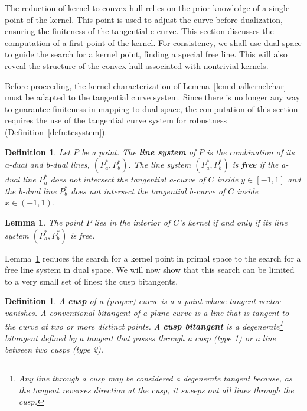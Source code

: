 \documentclass{sig-alternate}
\newtheorem{lemma}[theorem]{Lemma}
\newtheorem{defn2}[theorem]{Definition}
\begin{document}
The reduction of kernel to convex hull relies on the prior knowledge
of a single point of the kernel.
This point is used to adjust the curve before dualization, ensuring
the finiteness of the tangential c-curve.
This section discusses the computation of a first point of the kernel.
For consistency, we shall use dual space to guide the search for a kernel point,
finding a special free line.
This will also reveal the structure of the convex hull associated with nontrivial kernels.

Before proceeding, the kernel characterization of Lemma~\ref{lem:dualkernelchar}
must be adapted to the tangential curve system.
Since there is no longer any way to guarantee finiteness in mapping to dual space,
the computation of this section 
requires the use of the tangential curve system for robustness
(Definition~\ref{defn:tcsystem}).

\begin{defn2}
\label{defn:linesystem}
Let $P$ be a point.
The {\bf line system} of $P$ is the combination 
of its a-dual and b-dual lines, $(P^*_a, P^*_b)$.
The line system $(P^*_a, P^*_b)$ is {\bf free} 
if the a-dual line $P^*_a$ 
does not intersect the tangential a-curve of $C$ inside $y \in [-1,1]$
and the b-dual line $P^*_b$ 
does not intersect the tangential b-curve of $C$ inside $x \in (-1,1)$.
\end{defn2}

\begin{lemma}
\label{lem:robustdualkernelchar}
The point $P$ lies in the interior of $C$'s kernel if and only if 
its line system $(P^*_a,P^*_b)$ is free.
\end{lemma}

\noindent Lemma~\ref{lem:robustdualkernelchar} reduces the search for a kernel point
in primal space to the search for a free line system in dual space.
We will now show that this search can be limited to a very small set of lines:
the cusp bitangents.

\begin{defn2}
\label{defn:cusp}
A {\bf cusp} of a (proper) curve is a a point whose tangent vector vanishes.
A conventional bitangent of a plane curve is a line that
is tangent to the curve at two or more distinct points.
A {\bf cusp bitangent} is a degenerate\footnote{Any
	line through a cusp may be considered a degenerate tangent because,
	as the tangent reverses direction at the cusp,
	it sweeps out all lines through the cusp.}
bitangent defined by
a tangent that passes through a cusp (type 1) or a line between two cusps
(type 2).
\end{defn2}
\end{document}
